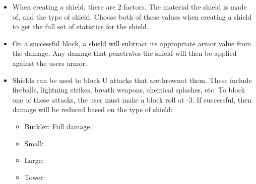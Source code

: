 \documentclass[twoside]{book}
\begin{document}
\begin{itemize}
      
  \item When creating a shield, there are 2 factors. The material the shield is made of, and the type of shield. Choose both of these values when creating a shield to get the full set of statistics for the shield.
  \item On a successful block, a shield will subtract its appropriate armor value from the damage. Any damage that penetrates the shield will then be applied against the users armor.
  \item Shields can be used to block U attacks that arethrownat them. These include fireballs, lightning strikes, breath weapons, chemical splashes, etc. To block one of these attacks, the user must make a block roll at -3. If successful, then damage will be reduced based on the type of shield:
\begin{itemize}
      
  \item Buckler: Full damage
  \item Small:
  \item Large:
  \item Tower:
\end{itemize}
  
\end{itemize}
  
\end{document}

